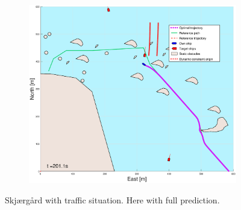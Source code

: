 \begin{figure}[ht]
\begin{subfigure}[b]{0.494\textwidth}
        \subcaption{}
    \end{subfigure}
    \hfill
    \begin{subfigure}[b]{0.494\textwidth}
        \centering
        \includegraphics[width=\textwidth]{Images/Figures/skjergard_m_trafikk_NEW/_Simple_0fig999_time=201}
        \subcaption{}
    \end{subfigure}
    \hfill
    \caption{Skjærgård with traffic situation. Here with full prediction.}
\end{figure}
